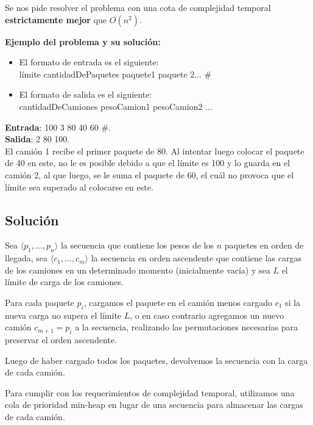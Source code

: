 \documentclass[a4paper,10pt,twoside]{article}
\begin{document}
Se nos pide resolver el problema con una cota de complejidad temporal \textbf{estrictamente mejor} que $O(n^2)$.

\textbf{Ejemplo del problema y su solución:}
\begin{itemize}
	\item El formato de entrada es el siguiente: \\
  límite cantidadDePaquetes paquete1 paquete 2... \#
	\item El formato de salida es el siguiente: \\
	cantidadDeCamiones pesoCamion1 pesoCamion2 ...
\end{itemize}

\textbf{Entrada}: 100 3 80 40 60 \#.\\
\textbf{Salida}: 2 80 100. \\
El camión 1 recibe el primer paquete de 80. Al intentar luego colocar el paquete de 40 en este, no le es posible debido a que el límite es 100 y lo guarda en el camión 2, al que luego, se le suma el paquete de 60, el cuál no provoca que el límite sea superado al colocarse en este.

\subsection{Solución}

Sea $\langle p_1, \ldots, p_n \rangle$ la secuencia que contiene los pesos de los $n$ paquetes en orden de llegada, sea $\langle c_1, \ldots, c_m \rangle$ la secuencia en orden ascendente que contiene las cargas de los camiones en un determinado momento (inicialmente vacía) y sea $L$ el límite de carga de los camiones.

Para cada paquete $p_i$, cargamos el paquete en el camión menos cargado $c_1$ si la nueva carga no supera el límite $L$, o en caso contrario agregamos un nuevo camión $c_{m+1} = p_i$ a la secuencia, realizando las permutaciones necesarias para preservar el orden ascendente.

Luego de haber cargado todos los paquetes, devolvemos la secuencia con la carga de cada camión.

Para cumplir con los requerimientos de complejidad temporal, utilizamos una cola de prioridad min-heap en lugar de una secuencia para almacenar las cargas de cada camión.
\end{document}
